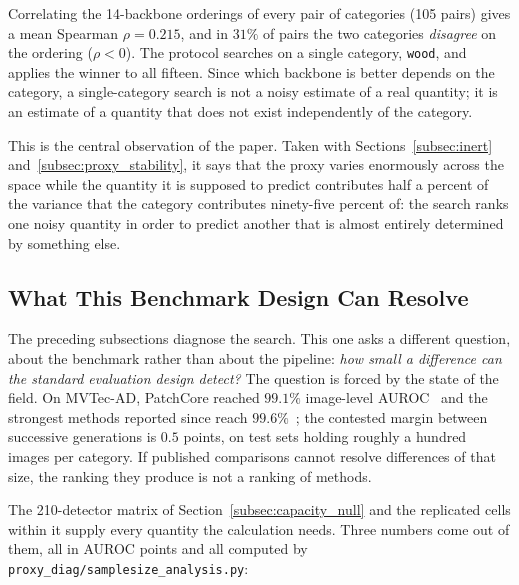 Correlating the 14-backbone orderings of every pair of categories (105 pairs)
gives a mean Spearman $\rho = 0.215$, and in $31\%$ of pairs the two categories
\emph{disagree} on the ordering ($\rho < 0$). The protocol searches on a single
category, \texttt{wood}, and applies the winner to all fifteen. Since which
backbone is better depends on the category, a single-category search is not a
noisy estimate of a real quantity; it is an estimate of a quantity that does not
exist independently of the category.

This is the central observation of the paper. Taken with
Sections~\ref{subsec:inert} and~\ref{subsec:proxy_stability}, it says that the
proxy varies enormously across the space while the quantity it is supposed to
predict contributes half a percent of the variance that the category contributes
ninety-five percent of: the search ranks one noisy quantity in order to predict
another that is almost entirely determined by something else.

\subsection{What This Benchmark Design Can Resolve}
\label{subsec:resolvability}

The preceding subsections diagnose the search. This one asks a different
question, about the benchmark rather than about the pipeline: \emph{how small a
difference can the standard evaluation design detect?} The question is forced by
the state of the field. On MVTec-AD, PatchCore reached $99.1\%$ image-level
AUROC~\cite{roth2022patchcore} and the strongest methods reported since reach
$99.6\%$~\cite{liu2023simplenet,guo2025dinomaly}; the contested margin between
successive generations is $0.5$ points, on test sets holding roughly a hundred
images per category. If published comparisons cannot resolve differences of that
size, the ranking they produce is not a ranking of methods.

The 210-detector matrix of Section~\ref{subsec:capacity_null} and the replicated
cells within it supply every quantity the calculation needs. Three numbers come
out of them, all in AUROC points and all computed by
\texttt{proxy\_diag/samplesize\_analysis.py}:

